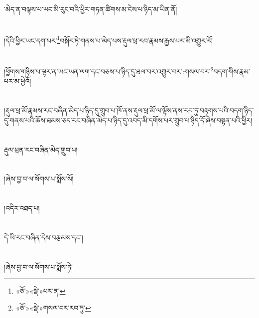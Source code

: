 ་མེད་ན་བལྟས་པ་ཡང་མི་རུང་བའི་ཕྱིར་གཏན་ཚིགས་མ་ངེས་པ་ཉིད་མ་ཡིན་ནོ།\chapter{ }།དེའི་ཕྱིར་ཡང་དག་པར་\footnote{«ཅོ་»«སྡེ་»པར་ན་}བསྐོར་ཏེ་གནས་པ་མེད་པས་རྡུལ་ཕྲ་རབ་རྣམས་རྒྱས་པར་མི་འགྱུར་རོ།\chapter{ }།ཕྱོགས་གཉིས་པ་ལྟར་ན་ཡང་ཡན་ལག་དང་བཅས་པ་ཉིད་དུ་ཐལ་བར་འགྱུར་བར་:གསལ་བར་\footnote{«ཅོ་»«སྡེ་»གསལ་བར་རབ་ཏུ་}བདག་གིས་རྣམ་པར་མ་ཕྱེའོ།\chapter{ }།རྡུལ་ཕྲ་མོ་རྣམས་རང་བཞིན་མེད་པ་ཉིད་དུ་གྲུབ་པ་ཁོ་ནས་རྡུལ་ཕྲ་མོ་ལ་ལྟོས་ནས་རབ་ཏུ་བརྟགས་པའི་བདག་ཉིད་དུ་གནས་པའི་ཆོས་ཐམས་ཅད་རང་བཞིན་མེད་པ་ཉིད་དུ་འབད་མི་དགོས་པར་གྲུབ་པ་ཉིད་དོ་ཞེས་བསྟན་པའི་ཕྱིར།\chapter{ }རྡུལ་ཕྲན་རང་བཞིན་མེད་གྲུབ་པ།\chapter{ }།ཞེས་བྱ་བ་ལ་སོགས་པ་སྨོས་སོ།\chapter{ }།འདིར་འཐད་པ།\chapter{ }དེ་ཡི་རང་བཞིན་དེས་བརྩམས་དང་།\chapter{ }།ཞེས་བྱ་བ་ལ་སོགས་པ་སྨོས་ཏེ།\chapt